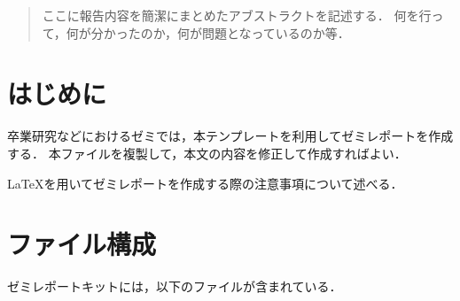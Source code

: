 \documentclass[uplatex]{jsarticle}
\date{2019/04/23}		%
\author{鈴木 秀和}		%
\begin{document}


\begin{abstract}
ここに報告内容を簡潔にまとめたアブストラクトを記述する．
何を行って，何が分かったのか，何が問題となっているのか等．
\end{abstract}



\section{はじめに}

卒業研究などにおけるゼミでは，本テンプレートを利用してゼミレポートを作成する．
本ファイルを複製して，本文の内容を修正して作成すればよい．

\LaTeX を用いてゼミレポートを作成する際の注意事項について述べる．


\section{ファイル構成}

ゼミレポートキットには，以下のファイルが含まれている．
\end{document}
